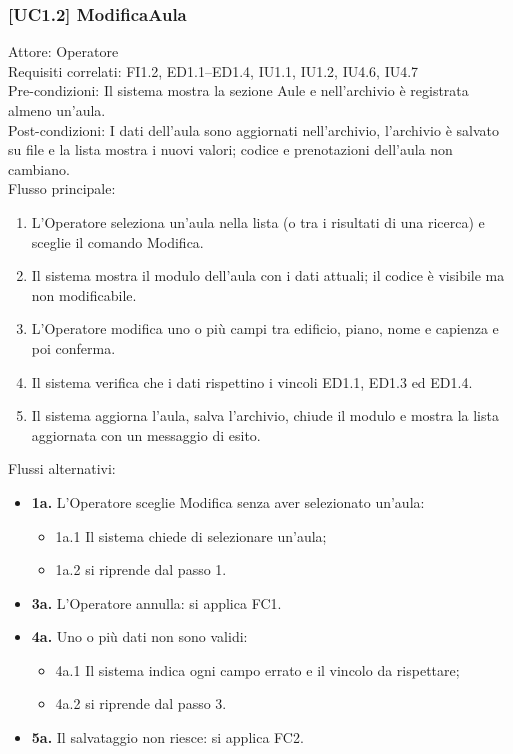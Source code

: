 \subsubsection{[UC1.2] ModificaAula}
\noindent Attore: Operatore\\
Requisiti correlati: FI1.2, ED1.1–ED1.4, IU1.1, IU1.2, IU4.6, IU4.7\\
Pre-condizioni: Il sistema mostra la sezione Aule e nell'archivio è registrata almeno un'aula.\\
Post-condizioni: I dati dell'aula sono aggiornati nell'archivio, l'archivio è salvato su file e la lista mostra i nuovi valori; codice e prenotazioni dell'aula non cambiano.\\

\noindent Flusso principale:
\begin{enumerate}
\item L'Operatore seleziona un'aula nella lista (o tra i risultati di una ricerca) e sceglie il comando Modifica.
\item Il sistema mostra il modulo dell'aula con i dati attuali; il codice è visibile ma non modificabile.
\item L'Operatore modifica uno o più campi tra edificio, piano, nome e capienza e poi conferma.
\item Il sistema verifica che i dati rispettino i vincoli ED1.1, ED1.3 ed ED1.4.
\item Il sistema aggiorna l'aula, salva l'archivio, chiude il modulo e mostra la lista aggiornata con un messaggio di esito.
\end{enumerate}
\noindent Flussi alternativi:
\begin{itemize}
\item \textbf{1a.} L'Operatore sceglie Modifica senza aver selezionato un'aula:
\begin{itemize}
\item 1a.1 Il sistema chiede di selezionare un'aula;
\item 1a.2 si riprende dal passo 1.
\end{itemize}
\item \textbf{3a.} L'Operatore annulla: si applica FC1.
\item \textbf{4a.} Uno o più dati non sono validi:
\begin{itemize}
\item 4a.1 Il sistema indica ogni campo errato e il vincolo da rispettare;
\item 4a.2 si riprende dal passo 3.
\end{itemize}
\item \textbf{5a.} Il salvataggio non riesce: si applica FC2.
\end{itemize}

